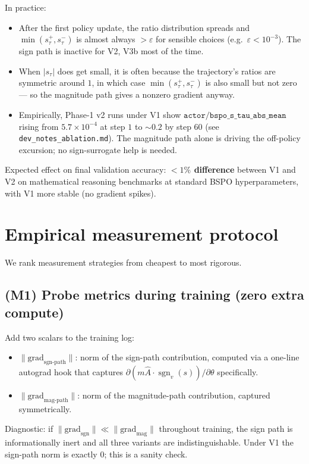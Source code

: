 \documentclass[11pt]{article}
\DeclareMathOperator{\sign}{sgn}
\begin{document}
In practice:
\begin{itemize}
\item After the first policy update, the ratio distribution spreads and
$\min(s_\tau^+, s_\tau^-)$ is almost always $> \varepsilon$ for sensible
choices (e.g.\ $\varepsilon < 10^{-3}$). The sign path is inactive for
V2, V3b most of the time.
\item When $|s_\tau|$ does get small, it is often because the
trajectory's ratios are symmetric around $1$, in which case
$\min(s_\tau^+, s_\tau^-)$ is also small but not zero --- so the
magnitude path gives a nonzero gradient anyway.
\item Empirically, Phase-1 v2 runs under V1 show
$\texttt{actor/bspo\_s\_tau\_abs\_mean}$ rising from $5.7\!\times\!10^{-4}$
at step $1$ to $\sim 0.2$ by step $60$ (see
\texttt{dev\_notes\_ablation.md}). The magnitude path alone is driving
the off-policy excursion; no sign-surrogate help is needed.
\end{itemize}

Expected effect on final validation accuracy: \textbf{$<1\%$ difference}
between V1 and V2 on mathematical reasoning benchmarks at standard BSPO
hyperparameters, with V1 more stable (no gradient spikes).

\section{Empirical measurement protocol}
\label{sec:measure}

We rank measurement strategies from cheapest to most rigorous.

\subsection*{(M1) Probe metrics during training (zero extra compute)}

Add two scalars to the training log:
\begin{itemize}
\item $\|\text{grad}_{\text{sgn-path}}\|$: norm of the sign-path
contribution, computed via a one-line autograd hook that captures
$\partial(m\hat A\cdot\sign_v(s))/\partial\theta$ specifically.
\item $\|\text{grad}_{\text{mag-path}}\|$: norm of the magnitude-path
contribution, captured symmetrically.
\end{itemize}

Diagnostic: if $\|\text{grad}_{\text{sgn}}\| \ll \|\text{grad}_{\text{mag}}\|$
throughout training, the sign path is informationally inert and all three
variants are indistinguishable. Under V1 the sign-path norm is exactly
$0$; this is a sanity check.
\end{document}
